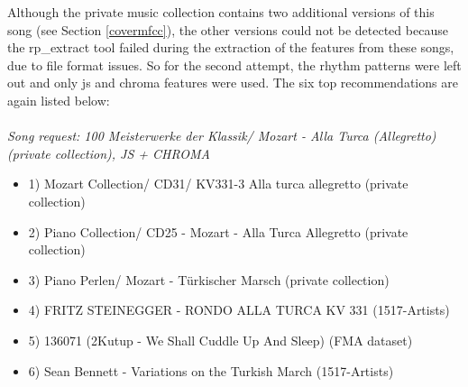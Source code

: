 \noindent Although the private music collection contains two additional versions of this song (see Section \ref{covermfcc}), the other versions could not be detected because the rp\_extract tool failed during the extraction of the features from these songs, due to file format issues. So for the second attempt, the rhythm patterns were left out and only js and chroma features were used. The six top recommendations are again listed below:\\
\ \\
\textit{\noindent Song request: 100 Meisterwerke der Klassik/ Mozart - Alla Turca (Allegretto) (private collection), JS + CHROMA}

\begin{itemize}
	\setlength\itemsep{-0.5em}
	\item 1) Mozart Collection/ CD31/ KV331-3 Alla turca allegretto (private collection)
	\item 2) Piano Collection/ CD25 - Mozart - Alla Turca Allegretto (private collection)
	\item 3) Piano Perlen/ Mozart - Türkischer Marsch (private collection)
	\item 4) FRITZ STEINEGGER - RONDO ALLA TURCA KV 331 (1517-Artists)
	\item 5) 136071 (2Kutup - We Shall Cuddle Up And Sleep) (FMA dataset) 
	\item 6) Sean Bennett - Variations on the Turkish March (1517-Artists)
\end{itemize}

